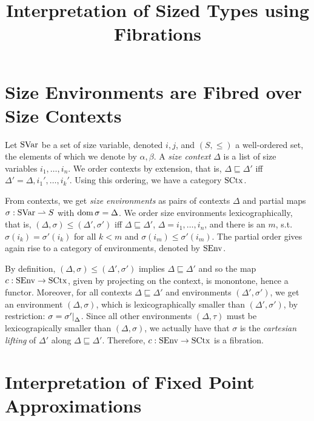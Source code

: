 \documentclass[runningheads,envcountsame,envcountsect,orivec]{llncs}
\title{Interpretation of Sized Types using Fibrations}
\begin{document}
\maketitle
\let\thefootnote\relax
{}

\section{Size Environments are Fibred over Size Contexts}
\label{sec:size-env}

Let $\mathrm{SVar}$ be a set of size variable, denoted $i, j$, and $(S, \leq)$ a
well-ordered set, the elements of which we denote by $\alpha, \beta$.
A \emph{size context} $\Delta$ is a list of size variables $i_1, \dotsc, i_n$.
We order contexts by extension, that is, $\Delta \sqsubseteq \Delta'$ iff
$\Delta' = \Delta, i_1', \dotsc, i_k'$.
Using this ordering, we have a category $\mathrm{SCtx}$.

From contexts, we get \emph{size environments} as pairs of contexts $\Delta$
and partial maps $\sigma : \mathrm{SVar} \rightharpoonup S$ with $\operatorname{dom} \sigma = \Delta$.
We order size environments lexicographically, that is,
$(\Delta, \sigma) \leq (\Delta', \sigma')$ iff $\Delta \sqsubseteq \Delta'$,
$\Delta = i_1, \dotsc, i_n$, and there is an $m$, s.t.
$\sigma(i_k) = \sigma'(i_k)$ for all $k < m$ and
$\sigma(i_m) \leq \sigma'(i_m)$.
The partial order gives again rise to a category of environments, denoted by
$\mathrm{SEnv}$.

By definition, $(\Delta, \sigma) \leq (\Delta', \sigma')$ implies
$\Delta \sqsubseteq \Delta'$ and so the map $c : \mathrm{SEnv} \to \mathrm{SCtx}$, given by
projecting on the context, is monontone, hence a functor.
Moreover, for all contexts $\Delta \sqsubseteq \Delta'$ and environments
$(\Delta', \sigma')$, we get an environment $(\Delta, \sigma)$, which is
lexicographically smaller than $(\Delta', \sigma')$, by restriction:
$\sigma = {\sigma'|}_{\Delta}$.
Since all other environments $(\Delta, \tau)$ must be lexicograpically smaller
than $(\Delta, \sigma)$, we actually have that $\sigma$ is the
\emph{cartesian lifting} of $\Delta'$ along $\Delta \sqsubseteq \Delta'$.
Therefore, $c : \mathrm{SEnv} \to \mathrm{SCtx}$ is a fibration.


\section{Interpretation of Fixed Point Approximations}
\label{sec:fp-approx}
\end{document}
